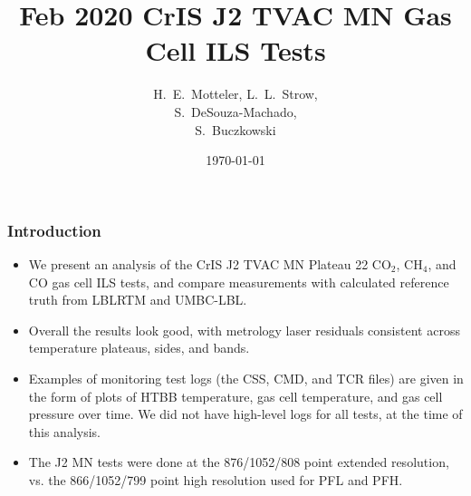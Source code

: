 \documentclass[9pt]{beamer}
\title{Feb 2020 CrIS J2 TVAC MN Gas Cell ILS Tests}
\author{H.~E.~Motteler, L.~L.~Strow, \\
  S.~DeSouza-Machado, \\
  S.~Buczkowski
}
\institute{
  UMBC Atmospheric Spectroscopy Lab \\
  Joint Center for Earth Systems Technology \\
}
\date{\today}
\begin{document}
\begin{frame}[plain]
\titlepage
\end{frame}
\begin{frame}
\frametitle{Introduction}
\begin{itemize}

  \item We present an analysis of the CrIS J2 TVAC MN Plateau 22
    CO$_2$, CH$_4$, and CO gas cell ILS tests, and compare
    measurements with calculated reference truth from LBLRTM and
    UMBC-LBL.

  \item Overall the results look good, with metrology laser
    residuals consistent across temperature plateaus, sides, and
    bands.

  \item Examples of monitoring test logs (the CSS, CMD, and TCR
    files) are given in the form of plots of HTBB temperature, gas
    cell temperature, and gas cell pressure over time.  We did not
    have high-level logs for all tests, at the time of this
    analysis.

  \item The J2 MN tests were done at the 876/1052/808 point extended
    resolution, vs. the 866/1052/799 point high resolution used for
    PFL and PFH.

\end{itemize}
\end{frame}
\end{document}
